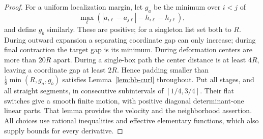 \begin{proof}
For a uniform localization margin, let $g_a$ be the minimum over
$i<j$ of
\[
 \max_\ell(|a_{i\ell}-a_{j\ell}|-h_{i\ell}-h_{j\ell}),
\]
and define $g_b$ similarly.  These are positive; for a singleton list
set both to $R$.  During outward expansion a separating coordinate
gap can only increase; during final contraction the target gap is its
minimum.  During deformation centers are more than $20R$ apart.
During a single-box path the center distance is at least $4R$, leaving
a coordinate gap at least $2R$.  Hence padding smaller than
$\tfrac18\min(R,g_a,g_b)$ satisfies Lemma~\ref{lem:bb-curl}
throughout.  Put all stages, and all straight segments, in consecutive
subintervals of $[1/4,3/4]$.  Their flat switches give a smooth finite
motion, with positive diagonal determinant-one linear parts.  That
lemma provides the velocity and the neighborhood assertion.  All
choices use rational inequalities and effective elementary functions,
which also supply bounds for every derivative.
\end{proof}
